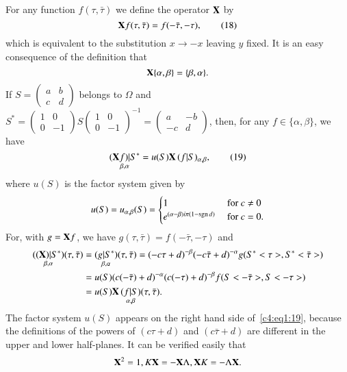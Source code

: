 For any function $f(\tau,\bar{\tau})$ we define the operator $\mathbf{X}$ by
\begin{equation*}
\mathbf{X} f(\tau,\bar{\tau}) = 
f(-\bar{\tau},-\tau), \tag{18}\label{c4:eq1:18}
\end{equation*}
which is equivalent to the substitution $x\to -x$ leaving $y$
fixed. It is an easy consequence of the definition that
$$
\mathbf{X} \{\alpha, \beta\} = \{\beta, \alpha\}.
$$
If $S = \left(\begin{smallmatrix} a&b\\c&d\end{smallmatrix}\right)$
  belongs to $\Omega$ and $S^{\ast} =
  \left(\begin{smallmatrix}1&0\\0&-1 \end{smallmatrix}\right)
  S\left(\begin{smallmatrix} 1&0\\0&-1 \end{smallmatrix}\right)^{-1} =
  \left(\begin{smallmatrix} a&-b\\-c&d\end{smallmatrix}\right)$, then,
    for any $f\in \{\alpha,\beta\}$, we have 
\begin{equation*}
\mathop{(\mathbf{X} f)|S^{\ast}}_{\beta,\alpha}
 = u(S) \mathbf{X} \mathop{(f|S)_{\alpha,\beta}}, \tag{19}\label{c4:eq1:19}
\end{equation*}
where $u(S)$ is the factor system given by
$$
u(S) = u_{\alpha,\beta} (S) = 
\begin{cases}
1 & \text{ for } c\neq0\\
e^{(\alpha-\beta)i\pi(1-\operatorname{sgn} d)} & \text{ for } c=0.
\end{cases}
$$
For, with $g=\mathbf{X} f$, we have $g (\tau,\bar{\tau}) = f(-\bar{\tau},
-\tau)$ and
{\fontsize{10}{12}\selectfont
\begin{align*}
\mathop{((\mathbf{X})|S^{\ast})}_{\beta, \alpha} (\tau,\bar{\tau}) & =
\mathop{(g|S^{\ast})}_{\beta,\alpha} (\tau,\bar{\tau}) =
(-c\tau+d)^{-\beta} (-c\bar{\tau}+d)^{-\alpha}
g(S^{\ast}<\tau>,S^{\ast}<\bar{\tau}>)\\
& = u(S)(c(-\bar{\tau})+d)^{-\alpha} (c(-\tau)+d)^{-\beta}
f(S<-\bar{\tau}>, S<-\tau>) \\
& = u(S) \mathbf{X} \mathop{(f|S)}_{\alpha,\beta} (\tau,\bar{\tau}).
\end{align*}}\relax
The factor system $u(S)$ appears on the right hand side of~\ref{c4:eq1:19},
because the definitions of the powers of $(c\tau+d)$ and
$(c\bar{\tau}+d)$ are different in the upper and lower half-planes. It
can be verified easily that 
$$
\mathbf{X}^2 = 1, K \mathbf{X} = - \mathbf{X} \Lambda, \mathbf{X} K = -\Lambda \mathbf{X}.
$$

